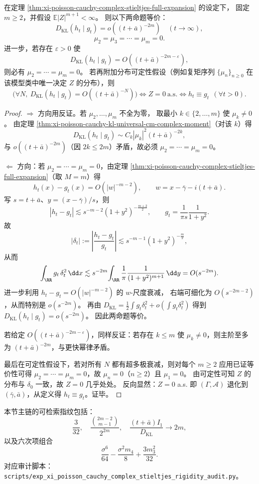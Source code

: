 \begin{theorem}[超多极衰减的分层刚性]\label{thm:xi-poisson-cauchy-supermultipole-hierarchy-rigidity}
在定理 \ref{thm:xi-poisson-cauchy-complex-stieltjes-full-expansion} 的设定下，
固定 \(m\ge 2\)，并假设 \(\mathbb E|Z|^{m+1}<\infty\)。
则以下两命题等价：
\[
D_{\mathrm{KL}}(h_t\mid g_t)=o((t+\bar a)^{-2m})\quad(t\to\infty),
\]
\[
\mu_2=\mu_3=\cdots=\mu_m=0.
\]
进一步，若存在 \(\varepsilon>0\) 使
\[
D_{\mathrm{KL}}(h_t\mid g_t)=O((t+\bar a)^{-2m-\varepsilon}),
\]
则必有 \(\mu_2=\cdots=\mu_m=0\)。
若再附加分布可定性假设（例如复矩序列 \(\{\mu_n\}_{n\ge0}\) 在该模型类中唯一决定 \(Z\) 的分布），则
\[
\bigl(\forall N,\ D_{\mathrm{KL}}(h_t\mid g_t)=O((t+\bar a)^{-N})\bigr)
\iff Z=0\ \text{a.s.}
\iff h_t\equiv g_t\ \ (\forall t>0).
\]
\end{theorem}
\begin{proof}
\(\Rightarrow\) 方向用反证。若 \(\mu_2,\dots,\mu_m\) 不全为零，
取最小 \(k\in\{2,\dots,m\}\) 使 \(\mu_k\neq 0\)。
由定理 \ref{thm:xi-poisson-cauchy-kl-universal-cm-complex-moment}（对该 \(k\)）得
\[
D_{\mathrm{KL}}(h_t\mid g_t)\sim C_k|\mu_k|^2(t+\bar a)^{-2k},
\]
与 \(o((t+\bar a)^{-2m})\)（因 \(2k\le 2m\)）矛盾，故必须 \(\mu_2=\cdots=\mu_m=0\)。
\par
\(\Leftarrow\) 方向：若 \(\mu_2=\cdots=\mu_m=0\)，由定理
\ref{thm:xi-poisson-cauchy-complex-stieltjes-full-expansion}（取 \(M=m\)）得
\[
h_t(x)-g_t(x)=O\!\left(|w|^{-m-2}\right),
\qquad
w=x-\bar\gamma-i(t+\bar a).
\]
写 \(s=t+\bar a\)、\(y=(x-\bar\gamma)/s\)，则
\[
|h_t-g_t|
\lesssim s^{-m-2}(1+y^2)^{-\frac{m+2}{2}},\qquad
g_t=\frac{1}{\pi s}\frac{1}{1+y^2}.
\]
故
\[
|\delta_t|:=\left|\frac{h_t-g_t}{g_t}\right|
\lesssim s^{-m-1}(1+y^2)^{-\frac m2},
\]
从而
\[
\int_{\RR}g_t\,\delta_t^2\,\dd x
\lesssim s^{-2m}\!\int_{\RR}\frac{1}{\pi}\frac{1}{(1+y^2)^{m+1}}\,\dd y
=O(s^{-2m}).
\]
进一步利用 \(h_t-g_t=O(|w|^{-m-2})\) 的 \(w\)-尺度衰减，
右端可细化为 \(O(s^{-2m-2})\)，从而特别是 \(o(s^{-2m})\)。
再由
\(
D_{\mathrm{KL}}=\frac12\int g_t\delta_t^2+o(\int g_t\delta_t^2)
\)
得到 \(D_{\mathrm{KL}}(h_t\mid g_t)=o(s^{-2m})\)。
因此两命题等价。
\par
若给定 \(O((t+\bar a)^{-2m-\varepsilon})\)，同样反证：若存在 \(k\le m\) 使 \(\mu_k\neq 0\)，则主阶至多为 \((t+\bar a)^{-2m}\)，与更快幂律矛盾。
\par
最后在可定性假设下，若对所有 \(N\) 都有超多极衰减，则对每个 \(m\ge 2\) 应用已证等价性可得
\(\mu_2=\cdots=\mu_m=0\)，故 \(\mu_n=0\)（\(n\ge 2\)）且 \(\mu_1=0\)。
由可定性可知 \(Z\) 的分布与 \(\delta_0\) 一致，故 \(Z=0\) 几乎处处。
反向显然：\(Z=0\) a.s. 即 \((\Gamma,\mathcal A)\) 退化到 \((\bar\gamma,\bar a)\)，从定义得 \(h_t\equiv g_t\)。证毕。
\end{proof}

\begin{remark}[同形检索与系数指纹]\label{rem:xi-poisson-cauchy-complex-stieltjes-rigidity-search-note}
本节主链的可检索指纹包括：
\[
\frac{3}{32},\quad
\frac{\binom{2m-2}{m-1}}{2^{2m}},\quad
\frac{(t+\bar a)I_1}{D_{\mathrm{KL}}}\to 2m,
\]
以及六次项组合
\[
\frac{\sigma^6}{64}-\frac{\sigma^2m_4}{8}+\frac{3m_3^2}{32}.
\]
对应审计脚本：
\texttt{scripts/exp\_xi\_poisson\_cauchy\_complex\_stieltjes\_rigidity\_audit.py}。
\end{remark}

\endinput
